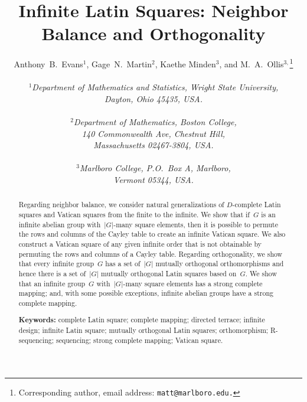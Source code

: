 \documentclass[12pt,a4paper]{article}
\begin{document}
\title{Infinite Latin Squares: Neighbor Balance and Orthogonality}

\author{Anthony~B.~Evans$^{1}$, Gage~N.~Martin$^{2}$, Kaethe Minden$^3$, and M.~A.~Ollis$^{3,}$\footnote{Corresponding author, email address: \texttt{matt@marlboro.edu.}}   \\
              \\
                {\it ${}^1$Department of Mathematics and Statistics, Wright State University,} \\    
              {\it Dayton, Ohio 45435, USA.} 
              \\
              \\
              {\it ${}^2$Department of Mathematics, Boston College,} \\
               {\it 140 Commonwealth Ave, Chestnut Hill,  } \\
              {\it  Massachusetts 02467-3804, USA.}
              \\
              \\
              {\it ${}^3$Marlboro College, P.O.~Box A, Marlboro,} \\    
              {\it Vermont 05344, USA.} }


\maketitle



\begin{abstract}
Regarding neighbor balance, we consider natural generalizations of $D$-complete Latin squares and Vatican squares from the finite to the infinite.   We show that if~$G$ is an infinite abelian group with~$|G|$-many square elements, then it is possible to permute the rows and columns of the Cayley table to create an infinite Vatican square. We also construct a Vatican square of any given infinite order that is not obtainable by permuting the rows and columns of a Cayley table.  Regarding orthogonality, we show that every infinite group~$G$ has a set of~$|G|$ mutually orthogonal orthomorphisms and hence there is a set of~$|G|$ mutually orthogonal Latin squares based on~$G$. We show that an infinite group~$G$ with~$|G|$-many square elements has a strong complete mapping; and, with some possible exceptions, infinite abelian groups have a strong complete mapping.


\vspace{3mm}
\noindent
{\bf Keywords:} complete Latin square; complete mapping; directed terrace; infinite design; infinite Latin square; mutually orthogonal Latin squares; orthomorphism; R-sequencing; sequencing; strong complete mapping; Vatican square.
\end{abstract}
\end{document}
